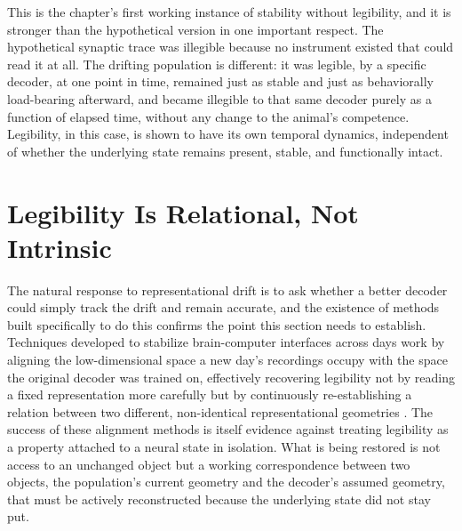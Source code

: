 \documentclass[11pt]{book}
\begin{document}
This is the chapter's first working instance of stability without legibility, and it is stronger than the hypothetical version in one important respect. The hypothetical synaptic trace was illegible because no instrument existed that could read it at all. The drifting population is different: it was legible, by a specific decoder, at one point in time, remained just as stable and just as behaviorally load-bearing afterward, and became illegible to that same decoder purely as a function of elapsed time, without any change to the animal's competence. Legibility, in this case, is shown to have its own temporal dynamics, independent of whether the underlying state remains present, stable, and functionally intact.

\section{Legibility Is Relational, Not Intrinsic}

The natural response to representational drift is to ask whether a better decoder could simply track the drift and remain accurate, and the existence of methods built specifically to do this confirms the point this section needs to establish. Techniques developed to stabilize brain-computer interfaces across days work by aligning the low-dimensional space a new day's recordings occupy with the space the original decoder was trained on, effectively recovering legibility not by reading a fixed representation more carefully but by continuously re-establishing a relation between two different, non-identical representational geometries \cite{degenhart2020}. The success of these alignment methods is itself evidence against treating legibility as a property attached to a neural state in isolation. What is being restored is not access to an unchanged object but a working correspondence between two objects, the population's current geometry and the decoder's assumed geometry, that must be actively reconstructed because the underlying state did not stay put.
\end{document}
